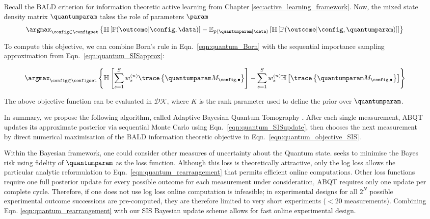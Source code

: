 Recall the BALD criterion for information theoretic active learning from Chapter \ref{sec:active_learning_framework}. Now, the mixed state density matrix $\quantumparam$ takes the role of parameters $\param$
\begin{equation}
\argmax_{\config\in\configset} \left\{ \mathbb{H}\left[\mathbb{P}(\outcome|\config,\data)\right] - \mathbb{E}_{p(\quantumparam\vert\data)}\left[\mathbb{H}\left[ \mathbb{P}(\outcome|\config,\quantumparam) \right] \right]\right\}\label{eqn:quantum_rearrangement}
\end{equation}

To compute this objective, we can combine Born's rule in Eqn.\ \eqref{eqn:quantum_Born} with the sequential importance sampling approximation from Eqn.\ \eqref{eqn:quantum_SISapprox}:

\begin{equation}
\argmax_{\config\in\configset} \left\{ \mathbb{H}\left[\sum_{s=1}^{S} w^{(n)}_s \trace\left\{\quantumparam M_{\config,\bullet} \right\} \right] - \sum_{s=1}^{S} w^{(n)}_s \mathbb{H}\left[ \trace\left\{\quantumparam M_{\config,\bullet} \right\} \right] \right\}\label{eqn:quantum_objective_SIS}
\end{equation}

The above objective function can be evaluated in $\mathcal{DK}$, where $K$ is the rank parameter used to define the prior over $\quantumparam$.

In summary, we propose the following algorithm, called Adaptive Bayesian Quantum Tomography \citep[ABQT, ][]{Huszar2012quantum}. After each single measurement, ABQT updates its approximate posterior via sequential Monte Carlo using Eqn.\ \eqref{eqn:quantum_SISupdate}, then chooses the next measurement by direct numerical maximisation of the BALD information theoretic objective in Eqn.\ \eqref{eqn:quantum_objective_SIS}.

Within the Bayesian framework, one could consider other measures of uncertainty about the Quantum state. \citep{SelfLearning} seeks to minimise the Bayes risk using fidelity of $\quantumparam$ as the loss function. Although this loss is theoretically attractive, only the log loss allows the particular analytic reformulation to Eqn.\ \eqref{eqn:quantum_rearrangement} that permits efficient online computations. Other loss functions require one full posterior update for every possible outcome for each measurement under consideration, ABQT requires only one update per complete cycle. Therefore, if one does not use log loss online computation is infeasible; in \citep{SelfLearningExperimental} experimental designs for all $2^N$ possible experimental outcome successions are pre-computed, they are therefore limited to very short experiments ($< 20$ measurements). Combining Eqn. \eqref{eqn:quantum_rearrangement} with our SIS Bayesian update scheme allows for fast online experimental design.

